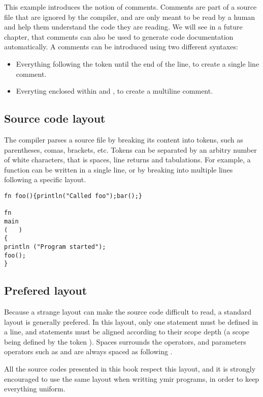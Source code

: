 This example introduces the notion of comments. Comments are part of a source
file that are ignored by the compiler, and are only meant to be read by a human
and help them understand the code they are reading. We will see in a future
chapter, that comments can also be used to generate code documentation
automatically. A comments can be introduced using two different syntaxes:
\begin{itemize}
\item Everything following the token \token{//} until the end of the line, to
  create a single line comment.
\item Everyting enclosed within \token{/*} and \token{*/}, to create a multiline comment.
\end{itemize}

\subsection{Source code layout}

The compiler parses a source file by breaking its content into tokens, such as
parentheses, comas, brackets, etc. Tokens can be separated by an arbitry number
of white characters, that is spaces, line returns and tabulations. For example,
a function can be written in a single line, or by breaking into multiple lines
following a specific layout.


\begin{lstlisting}[style=coloredverbatim, caption=Arbitrary code layout example]
fn foo(){println("Called foo");bar();}

fn
main
(   )
{
println ("Program started");
foo();
}
\end{lstlisting}

\subsection{Prefered layout}

Because a strange layout can make the source code difficult to read, a standard
layout is generally prefered. In this layout, only one statement must be defined
in a line, and statements must be aligned according to their scope depth (a
scope being defined by the token \token{\{\}}). Spaces surrounds the operators,
and parameters operators such as \token{()} and \token{[]} are always spaced
as following .

All the source codes presented in this book respect this layout, and it is
strongly encouraged to use the same layout when writting ymir programs, in order
to keep everything uniform.

